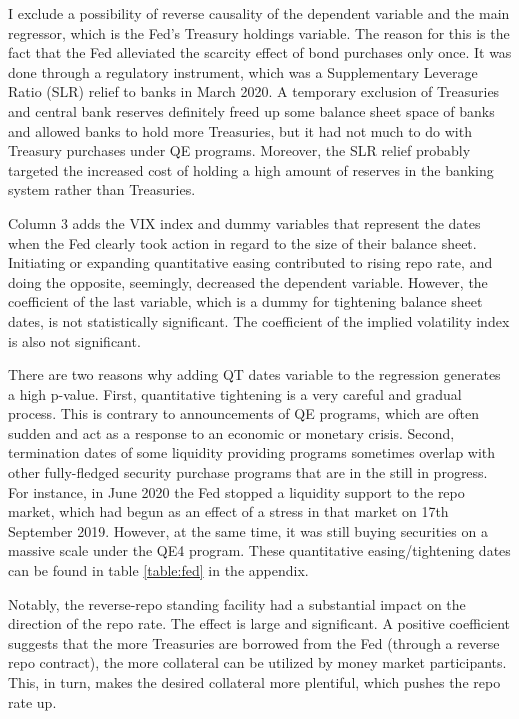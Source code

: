 \documentclass[11pt,a4paper,english,oneside]{article}
\begin{document}
I exclude a possibility of reverse causality of the dependent variable and the main regressor, which is the Fed's Treasury holdings variable. The reason for this is the fact that the Fed alleviated the scarcity effect of bond purchases only once. It was done through a regulatory instrument, which was a Supplementary Leverage Ratio (SLR) relief to banks in March 2020. A temporary exclusion of Treasuries and central bank reserves definitely freed up some balance sheet space of banks and allowed banks to hold more Treasuries, but it had not much to do with Treasury purchases under QE programs. Moreover, the SLR relief probably targeted the increased cost of holding a high amount of reserves in the banking system rather than Treasuries.

Column 3 adds the VIX index and dummy variables that represent the dates when the Fed clearly took action in regard to the size of their balance sheet. Initiating or expanding quantitative easing contributed to rising repo rate, and doing the opposite, seemingly, decreased the dependent variable. However, the coefficient of the last variable, which is a dummy for tightening balance sheet dates, is not statistically significant. The coefficient of the implied volatility index is also not significant.

There are two reasons why adding QT dates variable to the regression generates a high p-value. First, quantitative tightening is a very careful and gradual process. This is contrary to announcements of QE programs, which are often sudden and act as a response to an economic or monetary crisis. Second, termination dates of some liquidity providing programs sometimes overlap with other fully-fledged security purchase programs that are in the still in progress. For instance, in June 2020 the Fed stopped a liquidity support to the repo market, which had begun as an effect of a stress in that market on 17th September 2019. However, at the same time, it was still buying securities on a massive scale under the QE4 program. These quantitative easing/tightening dates can be found in table \ref{table:fed} in the appendix.

Notably, the reverse-repo standing facility had a substantial impact on the direction of the repo rate. The effect is large and significant. A positive coefficient suggests that the more Treasuries are borrowed from the Fed (through a reverse repo contract), the more collateral can be utilized by money market participants. This, in turn, makes the desired collateral more plentiful, which pushes the repo rate up.
\end{document}
